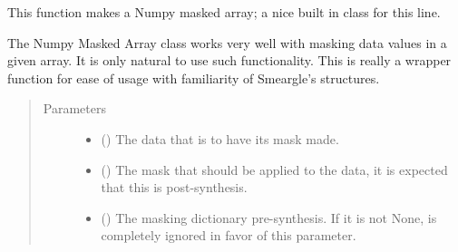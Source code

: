 \documentclass[letterpaper,10pt,english]{sphinxmanual}
\begin{document}

\begin{fulllineitems}
\label{\detokenize{python_docstrings/IfA_Smeargle.echo.echo_functions:IfA_Smeargle.echo.echo_functions.numpy_masked_array}}
This function makes a Numpy masked array; a nice built in class for this line.

The Numpy Masked Array class works very well with masking data values in a given array.
It is only natural to use such functionality. This is really a wrapper function for ease of
usage with familiarity of Smeargle’s structures.
\begin{quote}\begin{description}
\item[{Parameters}] \leavevmode\begin{itemize}
\item {} 
 () \textendash{} The data that is to have its mask made.

\item {} 
 () \textendash{} The mask that should be applied to the data, it is expected that this is post-synthesis.

\item {} 
 (\sphinxstyleliteralemphasis{\sphinxupquote{ (}}\sphinxstyleliteralemphasis{\sphinxupquote{)}}) \textendash{} The masking dictionary pre-synthesis. If it is not None,  is
completely ignored in favor of this parameter.

\end{itemize}

\end{description}\end{quote}

\end{fulllineitems}
\end{document}
